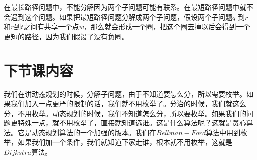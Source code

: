 在最长路径问题中，不能分解因为两个子问题可能有联系。在最短路径问题中就不会遇到这个问题。如果把最短路径问题分解成两个子问题，假设两个子问题$q$ 到$r$和$r$到$t$之间有共享一个点$w$，那么就会形成一个圈，把这个圈去掉以后会得到一个更短的路径，因为我们假设了没有负圈。

\section{下节课内容}
我们在讲动态规划的时候，分解子问题，由于不知道要怎么分，所以需要枚举。如果我们加入一点更严的限制的话，我们就不用枚举了。分治的时候，我们就这么分，不用枚举。动态规划的时候，我们不知道怎么分，所以要枚举。如果我们的问题更特殊一点，就不用枚举了，直接就知道选谁。这是什么算法呢？这就是贪心算法。它是动态规划算法的一个加强的版本。我们在$Bellman-Ford$算法中用到枚举，如果我们加一个条件，我们就知道下家走谁，根本就不用枚举，这就是$Dijkstra$算法。

